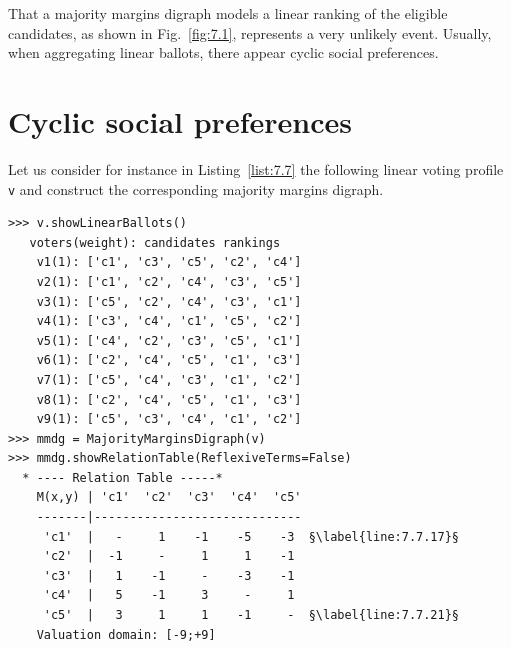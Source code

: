 That a majority margins digraph models a linear ranking of the eligible candidates, as shown in Fig.~\vref{fig:7.1}, represents a very unlikely event. Usually, when aggregating linear ballots, there appear cyclic social preferences.

\section{Cyclic social preferences}
\label{sec:7.4}

Let us consider for instance in Listing~\vref{list:7.7} the following linear voting profile \texttt{v} and construct the corresponding majority margins digraph.
\begin{lstlisting}[caption={Example of cyclic social preferences},label=list:7.7]
>>> v.showLinearBallots()
   voters(weight): candidates rankings
    v1(1): ['c1', 'c3', 'c5', 'c2', 'c4']
    v2(1): ['c1', 'c2', 'c4', 'c3', 'c5']
    v3(1): ['c5', 'c2', 'c4', 'c3', 'c1']
    v4(1): ['c3', 'c4', 'c1', 'c5', 'c2']
    v5(1): ['c4', 'c2', 'c3', 'c5', 'c1']
    v6(1): ['c2', 'c4', 'c5', 'c1', 'c3']
    v7(1): ['c5', 'c4', 'c3', 'c1', 'c2']
    v8(1): ['c2', 'c4', 'c5', 'c1', 'c3']
    v9(1): ['c5', 'c3', 'c4', 'c1', 'c2']
>>> mmdg = MajorityMarginsDigraph(v)
>>> mmdg.showRelationTable(ReflexiveTerms=False)
  * ---- Relation Table -----*
    M(x,y) | 'c1'  'c2'  'c3'  'c4'  'c5'	  
    -------|-----------------------------
     'c1'  |   -     1    -1    -5    -3  §\label{line:7.7.17}§
     'c2'  |  -1     - 	   1     1    -1	 
     'c3'  |   1    -1 	   -    -3    -1	 
     'c4'  |   5    -1     3     -     1  
     'c5'  |   3     1 	   1    -1     -  §\label{line:7.7.21}§ 
    Valuation domain: [-9;+9]
\end{lstlisting}    

